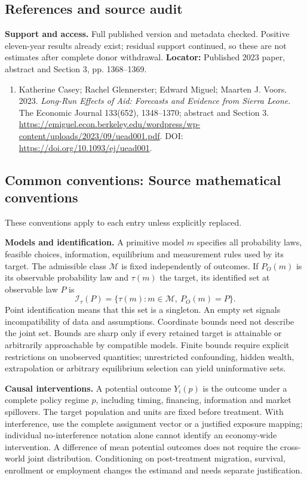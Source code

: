 \documentclass[11pt,a4paper]{article}
\begin{document}
\subsection*{References and source audit}
\textbf{Support and access.} Full published version and metadata checked. Positive eleven-year results already exist; residual support continued, so these are not estimates after complete donor withdrawal. \textbf{Locator:} Published 2023 paper, abstract and Section 3, pp. 1368--1369.
\begin{enumerate}\raggedright
\item\hypertarget{definitions:source:30007657:1}{} Katherine Casey; Rachel Glennerster; Edward Miguel; Maarten J. Voors. 2023. \emph{Long-Run Effects of Aid: Forecasts and Evidence from Sierra Leone}. The Economic Journal 133(652), 1348--1370; abstract and Section 3.
\url{https://emiguel.econ.berkeley.edu/wordpress/wp-content/uploads/2023/09/uead001.pdf}.
DOI: \url{https://doi.org/10.1093/ej/uead001}.
\end{enumerate}

\subsection*{Common conventions: Source mathematical conventions}

These conventions apply to each entry unless explicitly replaced.

\textbf{Models and identification.} A primitive model \(m\) specifies all probability laws, feasible choices, information, equilibrium and measurement rules used by its target. The admissible class \(\mathcal M\) is fixed independently of outcomes. If \(P_O(m)\) is its observable probability law and \(\tau(m)\) the target, its identified set at observable law \(P\) is
\[
 \mathcal I_\tau(P)=\{\tau(m):m\in\mathcal M,\ P_O(m)=P\}.
\]
Point identification means that this set is a singleton. An empty set signals incompatibility of data and assumptions. Coordinate bounds need not describe the joint set. Bounds are sharp only if every retained target is attainable or arbitrarily approachable by compatible models. Finite bounds require explicit restrictions on unobserved quantities; unrestricted confounding, hidden wealth, extrapolation or arbitrary equilibrium selection can yield uninformative sets.

\textbf{Causal interventions.} A potential outcome \(Y_i(p)\) is the outcome under a complete policy regime \(p\), including timing, financing, information and market spillovers. The target population and units are fixed before treatment. With interference, use the complete assignment vector or a justified exposure mapping; individual no-interference notation alone cannot identify an economy-wide intervention. A difference of mean potential outcomes does not require the cross-world joint distribution. Conditioning on post-treatment migration, survival, enrollment or employment changes the estimand and needs separate justification.
\end{document}
